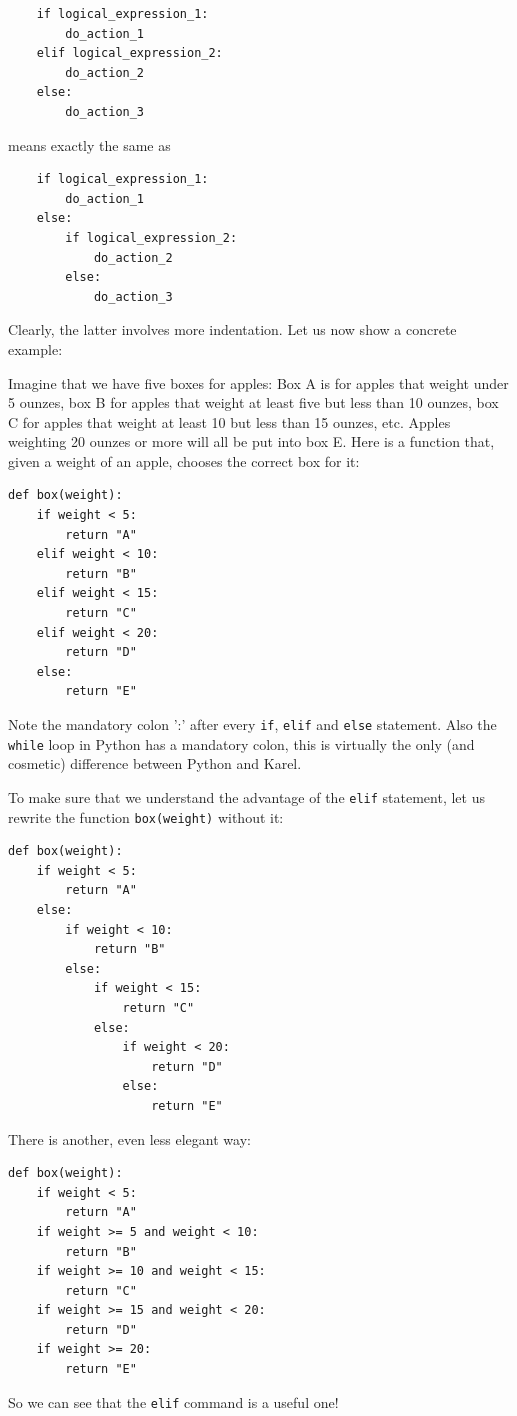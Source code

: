\begin{verbatim}
    if logical_expression_1:
        do_action_1
    elif logical_expression_2:
        do_action_2
    else:
        do_action_3
\end{verbatim}
means exactly the same as

\begin{verbatim}
    if logical_expression_1:
        do_action_1
    else:
        if logical_expression_2:
            do_action_2
        else:
            do_action_3
\end{verbatim}
Clearly, the latter involves more indentation. Let us now show a concrete example:

Imagine that we have five boxes for apples: Box A is for apples that weight under 
5 ounzes, box B for apples that weight at least five but less than 10 ounzes, 
box C for apples that weight at least 10 but less than 15 ounzes, etc. Apples weighting 
20 ounzes or more will all be put into box E. Here is a function that, given 
a weight of an apple, chooses the correct box for it:

\begin{verbatim}
def box(weight):
    if weight < 5:
        return "A"
    elif weight < 10:
        return "B"
    elif weight < 15:
        return "C"
    elif weight < 20:
        return "D"
    else:
        return "E"
\end{verbatim}
Note the mandatory colon ':' after every {\tt if}, {\tt elif} and {\tt else} statement. Also
the {\tt while} loop in Python has a mandatory colon, this is virtually the only 
(and cosmetic) difference between Python and Karel.

To make sure that we understand the advantage of the {\tt elif} statement, let us rewrite 
the function {\tt box(weight)} without it:

\begin{verbatim}
def box(weight):
    if weight < 5:
        return "A"
    else:
        if weight < 10:
            return "B"
        else:
            if weight < 15:
                return "C"
            else:
                if weight < 20:
                    return "D"
                else:
                    return "E"
\end{verbatim}
There is another, even less elegant way:

\begin{verbatim}
def box(weight):
    if weight < 5:
        return "A"
    if weight >= 5 and weight < 10:
        return "B"
    if weight >= 10 and weight < 15:
        return "C"
    if weight >= 15 and weight < 20:
        return "D"
    if weight >= 20:
        return "E"
\end{verbatim}
So we can see that the {\tt elif} command is a useful one!

